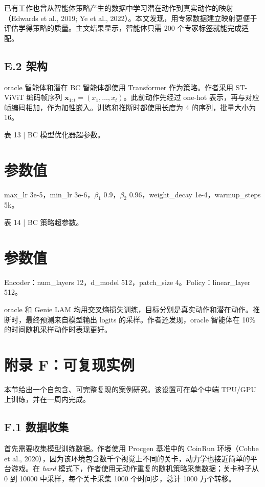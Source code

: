 \documentclass[10pt]{article}
\begin{document}
已有工作也曾从智能体策略产生的数据中学习潜在动作到真实动作的映射（Edwards et al., 2019; Ye et al., 2022）。本文发现，用专家数据建立映射更便于评估学得策略的质量。主文结果显示，智能体只需 200 个专家标签就能完成适配。

\subsection*{E.2 架构}

oracle 智能体和潜在 BC 智能体都使用 Transformer 作为策略。作者采用 ST-ViViT 编码帧序列 $\mathbf{x}_{1:t}=(x_1,\ldots,x_t)$。此前动作先经过 one-hot 表示，再与对应帧编码相加，作为加性嵌入。训练和推断时都使用长度为 4 的序列，批量大小为 16。

表 13 | BC 模型优化器超参数。

\section*{参数值}
max\_lr 3e-5，min\_lr 3e-6，$\beta_1$ 0.9，$\beta_2$ 0.96，weight\_decay 1e-4，warmup\_steps 5k。

表 14 | BC 策略超参数。

\section*{参数值}
Encoder：num\_layers 12，d\_model 512，patch\_size 4。Policy：linear\_layer 512。

oracle 和 Genie LAM 均用交叉熵损失训练，目标分别是真实动作和潜在动作。推断时，最终预测来自模型输出 logits 的采样。作者还发现，oracle 智能体在 10\% 的时间随机采样动作时表现更好。

\section*{附录 F：可复现实例}

本节给出一个自包含、可完整复现的案例研究。该设置可在单个中端 TPU/GPU 上训练，并在一周内完成。

\subsection*{F.1 数据收集}

首先需要收集模型训练数据。作者使用 Procgen 基准中的 CoinRun 环境（Cobbe et al., 2020），因为该环境包含数千个视觉上不同的关卡，动力学也接近简单的平台游戏。在 \textit{hard} 模式下，作者使用无动作重复的随机策略采集数据；关卡种子从 0 到 10000 中采样，每个关卡采集 1000 个时间步，总计 1000 万个转移。
\end{document}
